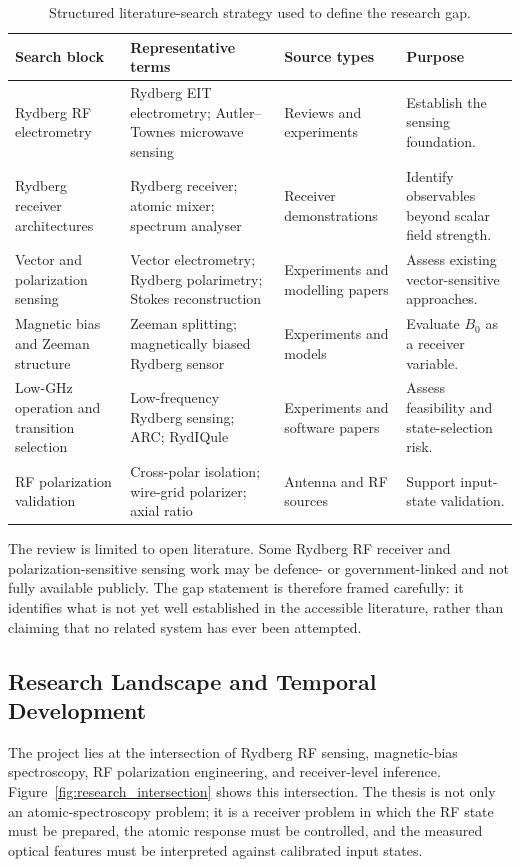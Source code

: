 \documentclass{ieeeaccess}
\begin{document}
\begin{table}[!t]
\caption{Structured literature-search strategy used to define the research gap.}
\label{tab:lit_search_strategy}
\centering
\renewcommand{\arraystretch}{1.10}
\scriptsize
\begin{tabular}{p{} p{} p{} p{}}
\hline
\textbf{Search block} & \textbf{Representative terms} & \textbf{Source types} & \textbf{Purpose} \\
\hline
Rydberg RF electrometry & Rydberg EIT electrometry; Autler--Townes microwave sensing & Reviews and experiments & Establish the sensing foundation. \\
Rydberg receiver architectures & Rydberg receiver; atomic mixer; spectrum analyser & Receiver demonstrations & Identify observables beyond scalar field strength. \\
Vector and polarization sensing & Vector electrometry; Rydberg polarimetry; Stokes reconstruction & Experiments and modelling papers & Assess existing vector-sensitive approaches. \\
Magnetic bias and Zeeman structure & Zeeman splitting; magnetically biased Rydberg sensor & Experiments and models & Evaluate \(B_0\) as a receiver variable. \\
Low-GHz operation and transition selection & Low-frequency Rydberg sensing; ARC; RydIQule & Experiments and software papers & Assess feasibility and state-selection risk. \\
RF polarization validation & Cross-polar isolation; wire-grid polarizer; axial ratio & Antenna and RF sources & Support input-state validation. \\
\hline
\end{tabular}
\end{table}

The review is limited to open literature. Some Rydberg RF receiver and polarization-sensitive sensing work may be defence- or government-linked and not fully available publicly. The gap statement is therefore framed carefully: it identifies what is not yet well established in the accessible literature, rather than claiming that no related system has ever been attempted.

\subsection{Research Landscape and Temporal Development}
\label{subsec:lit_landscape_temporal}

The project lies at the intersection of Rydberg RF sensing, magnetic-bias spectroscopy, RF polarization engineering, and receiver-level inference. Figure~\ref{fig:research_intersection} shows this intersection. The thesis is not only an atomic-spectroscopy problem; it is a receiver problem in which the RF state must be prepared, the atomic response must be controlled, and the measured optical features must be interpreted against calibrated input states.
\end{document}
